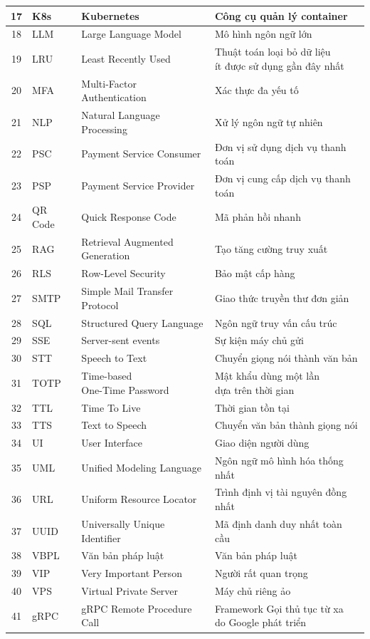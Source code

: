 \begin{table}[ht]
\begin{tabular}{|c|p{2.1cm}|p{4.3cm}|p{5.4cm}|}
17 & K8s & Kubernetes & Công cụ quản lý container \\ \hline
18 & LLM & Large Language Model & Mô hình ngôn ngữ lớn \\ \hline
19 & LRU & Least Recently Used & \makecell[l]{Thuật toán loại bỏ dữ liệu \\ ít được sử dụng gần đây nhất} \\ \hline
20 & MFA & Multi-Factor Authentication & Xác thực đa yếu tố \\ \hline
21 & NLP & Natural Language Processing & Xử lý ngôn ngữ tự nhiên \\ \hline
22 & PSC & Payment Service Consumer & Đơn vị sử dụng dịch vụ thanh toán \\ \hline
23 & PSP & Payment Service Provider & Đơn vị cung cấp dịch vụ thanh toán \\ \hline
24 & QR Code & Quick Response Code & Mã phản hồi nhanh \\ \hline
25 & RAG & \makecell[l]{Retrieval Augmented \\ Generation} & Tạo tăng cường truy xuất \\ \hline
26 & RLS & Row-Level Security & Bảo mật cấp hàng \\ \hline
27 & SMTP & Simple Mail Transfer Protocol & Giao thức truyền thư đơn giản \\ \hline
28 & SQL & Structured Query Language & Ngôn ngữ truy vấn cấu trúc \\ \hline
29 & SSE & Server-sent events & Sự kiện máy chủ gửi \\ \hline
30 & STT & Speech to Text & Chuyển giọng nói thành văn bản \\ \hline
31 & TOTP & \makecell[l]{Time-based \\ One-Time Password} & \makecell[l]{Mật khẩu dùng một lần \\ dựa trên thời gian} \\ \hline
32 & TTL & Time To Live & Thời gian tồn tại \\ \hline
33 & TTS & Text to Speech & Chuyển văn bản thành giọng nói \\ \hline
34 & UI & User Interface & Giao diện người dùng \\ \hline
35 & UML & Unified Modeling Language & Ngôn ngữ mô hình hóa thống nhất \\ \hline
36 & URL & Uniform Resource Locator & Trình định vị tài nguyên đồng nhất \\ \hline
37 & UUID & Universally Unique Identifier & Mã định danh duy nhất toàn cầu \\ \hline
38 & VBPL & Văn bản pháp luật & Văn bản pháp luật \\ \hline
39 & VIP & Very Important Person & Người rất quan trọng \\ \hline
40 & VPS & Virtual Private Server & Máy chủ riêng ảo \\ \hline
41 & gRPC & gRPC Remote Procedure Call & \makecell[l]{Framework Gọi thủ tục từ xa \\ do Google phát triển} \\ \hline
\end{tabular}
\end{table}

\newpage
